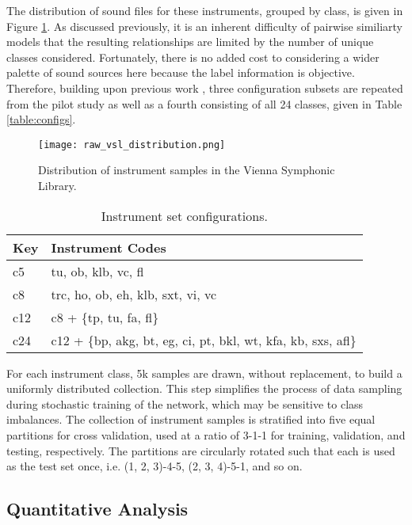The distribution of sound files for these instruments, grouped by class, is given in Figure \ref{fig:c24_dist}.
As discussed previously, it is an inherent difficulty of pairwise similiarty models that the resulting relationships are limited by the number of unique classes considered.
Fortunately, there is no added cost to considering a wider palette of sound sources here because the label information is objective.
Therefore, building upon previous work \cite{Humphrey2011}, three configuration subsets are repeated from the pilot study as well as a fourth consisting of all 24 classes, given in Table \ref{table:configs}.

\begin{figure}[h]
\centering
\texttt{[image: raw\_vsl\_distribution.png]}
\caption{Distribution of instrument samples in the Vienna Symphonic Library.}
\label{fig:c24_dist}
\end{figure}


\begin{table*}[h]
\begin{center}
\caption{Instrument set configurations.}
\begin{tabular}{l | l }
Key & Instrument Codes \\
\hline
c5 & tu, ob, klb, vc, fl \\
c8 & trc, ho, ob, eh, klb, sxt, vi, vc \\
c12 & c8 + \{tp, tu, fa, fl\} \\
c24 & c12 + \{bp, akg, bt, eg, ci, pt, bkl, wt, kfa, kb, sxs, afl\} \\
\hline
\end{tabular}
\label{tab:things}
\end{center}
\end{table*}

For each instrument class, 5k samples are drawn, without replacement, to build a uniformly distributed collection.
This step simplifies the process of data sampling during stochastic training of the network, which may be sensitive to class imbalances.
The collection of instrument samples is stratified into five equal partitions for cross validation, used at a ratio of 3-1-1 for training, validation, and testing, respectively.
The partitions are circularly rotated such that each is used as the test set once, i.e. (1, 2, 3)-4-5, (2, 3, 4)-5-1, and so on.


\subsection{Quantitative Analysis}

